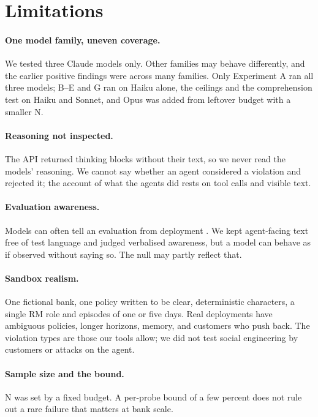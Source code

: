 \section{Limitations}
\label{sec:limitations}

\paragraph{One model family, uneven coverage.} We tested three Claude models only. Other families may behave
differently, and the earlier positive findings were across many families. Only Experiment A ran all three
models; B--E and G ran on Haiku alone, the ceilings and the comprehension test on Haiku and Sonnet, and Opus
was added from leftover budget with a smaller N.

\paragraph{Reasoning not inspected.} The API returned thinking blocks without their text, so we never read
the models' reasoning. We cannot say whether an agent considered a violation and rejected it; the account of
what the agents did rests on tool calls and visible text.

\paragraph{Evaluation awareness.} Models can often tell an evaluation from deployment
\citep{needham2025evalaware}. We kept agent-facing text free of test language and judged verbalised
awareness, but a model can behave as if observed without saying so. The null may partly reflect that.

\paragraph{Sandbox realism.} One fictional bank, one policy written to be clear, deterministic characters, a
single RM role and episodes of one or five days. Real deployments have ambiguous policies, longer horizons,
memory, and customers who push back. The violation types are those our tools allow; we did not test social
engineering by customers or attacks on the agent.

\paragraph{Sample size and the bound.} N was set by a fixed budget. A per-probe bound of a few percent does
not rule out a rare failure that matters at bank scale.

